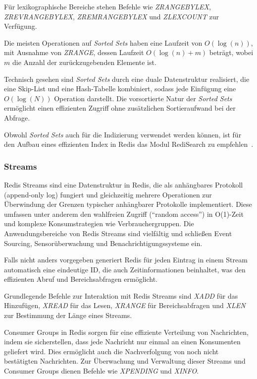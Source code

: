 Für lexikographische Bereiche stehen Befehle wie \emph{ZRANGEBYLEX}, \emph{ZREVRANGEBYLEX}, \emph{ZREMRANGEBYLEX} und \emph{ZLEXCOUNT} zur Verfügung.

Die meisten Operationen auf \emph{Sorted Sets} haben eine Laufzeit von \(O(\log(n))\), mit Ausnahme von \emph{ZRANGE}, dessen Laufzeit \(O(\log(n) + m)\) beträgt, wobei \(m\) die Anzahl der zurückzugebenden Elemente ist.

Technisch gesehen sind \emph{Sorted Sets} durch eine duale Datenstruktur realisiert, die eine Skip-List und eine Hash-Tabelle kombiniert, sodass jede Einfügung eine \(O(\log(N))\) Operation darstellt. Die vorsortierte Natur der \emph{Sorted Sets} ermöglicht einen effizienten Zugriff ohne zusätzlichen Sortieraufwand bei der Abfrage.

Obwohl \emph{Sorted Sets} auch für die Indizierung verwendet werden können, ist für den Aufbau eines effizienten Index in Redis das Modul RediSearch zu empfehlen~\cite{redis_ltd_sorted-sets_nodate}.


\subsubsection{Streams}
Redis Streams sind eine Datenstruktur in Redis, die als anhängbares Protokoll (append-only log) fungiert und gleichzeitig mehrere Operationen zur Überwindung der Grenzen typischer anhängbarer Protokolle implementiert. Diese umfassen unter anderem den wahlfreien Zugriff (\enquote{random access}) in O(1)-Zeit und komplexe Konsumstrategien wie Verbrauchergruppen.
Die Anwendungsbereiche von Redis Streams sind vielfältig und schließen Event Sourcing, Sensorüberwachung und Benachrichtigungssysteme ein.

Falls nicht anders vorgegeben generiert Redis für jeden Eintrag in einem Stream automatisch eine eindeutige ID, die auch Zeitinformationen beinhaltet, was den effizienten Abruf und Bereichsabfragen ermöglicht.

Grundlegende Befehle zur Interaktion mit Redis Streams sind \emph{XADD} für das Hinzufügen, \emph{XREAD} für das Lesen, \emph{XRANGE} für Bereichsabfragen und \emph{XLEN} zur Bestimmung der Länge eines Streams.

Consumer Groups in Redis sorgen für eine effiziente Verteilung von Nachrichten, indem sie sicherstellen, dass jede Nachricht nur einmal an einen Konsumenten geliefert wird. Dies ermöglicht auch die Nachverfolgung von noch nicht bestätigten Nachrichten. Zur Überwachung und Verwaltung dieser Streams und Consumer Groups dienen Befehle wie \emph{XPENDING} und \emph{XINFO}.


